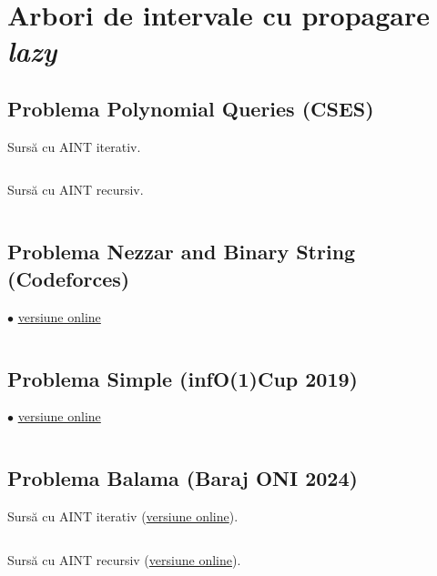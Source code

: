 \documentclass[../main.tex]{subfiles}
\begin{document}
\chapter{Arbori de intervale cu propagare \textit{lazy}}

\section{Problema Polynomial Queries (CSES)}
\label{code:polynomial-queries}

Sursă cu AINT iterativ.

\inputminted{cpp}{../src/segment-trees/polynomial-queries-iter.cpp}

Sursă cu AINT recursiv.

\inputminted{cpp}{../src/segment-trees/polynomial-queries-rec.cpp}

\section{Problema Nezzar and Binary String (Codeforces)}
\label{code:nezzar-and-binary-string}
$\bullet$
\href{https://codeforces.com/contest/1478/submission/283167039}{versiune online}

\inputminted{cpp}{../src/segment-trees/nezzar-and-binary-string.cpp}

\section{Problema Simple (infO(1)Cup 2019)}
\label{code:simple}
$\bullet$
\href{https://kilonova.ro/submissions/802142}{versiune online}

\inputminted{cpp}{../src/segment-trees/simple.cpp}

\section{Problema Balama (Baraj ONI 2024)}
\label{code:balama}

Sursă cu AINT iterativ (\href{https://kilonova.ro/submissions/800609}{versiune online}).

\inputminted{cpp}{../src/segment-trees/balama-iter.cpp}

Sursă cu AINT recursiv (\href{https://kilonova.ro/submissions/367617}{versiune online}).

\inputminted{cpp}{../src/segment-trees/balama-rec.cpp}
\end{document}
